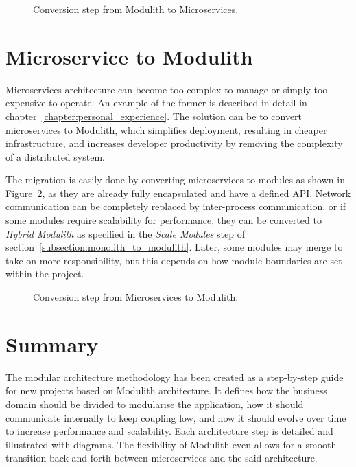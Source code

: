 \begin{figure}
    \centering
    
    \caption{Conversion step from Modulith to Microservices.\label{fig:modulith_to_microservices_steps}}
\end{figure}


\section{Microservice to Modulith}
\label{subsection:microservices_to_modulith}
Microservices architecture can become too complex to manage or simply too expensive to operate. An example of the former is described in detail in chapter~\ref{chapter:personal_experience}. The solution can be to convert microservices to Modulith, which simplifies deployment, resulting in cheaper infrastructure, and increases developer productivity by removing the complexity of a distributed system.

The migration is easily done by converting microservices to modules as shown in Figure~\ref{fig:microservices_to_modulith_steps}, as they are already fully encapsulated and have a defined API. Network communication can be completely replaced by inter-process communication, or if some modules require scalability for performance, they can be converted to \textit{Hybrid Modulith} as specified in the \textit{Scale Modules} step of section~\ref{subsection:monolith_to_modulith}. Later, some modules may merge to take on more responsibility, but this depends on how module boundaries are set within the project.

\begin{figure}
    \centering
    
    \caption{Conversion step from Microservices to Modulith.\label{fig:microservices_to_modulith_steps}}
\end{figure}

\section{Summary}
The modular architecture methodology has been created as a step-by-step guide for new projects based on Modulith architecture. It defines how the business domain should be divided to modularise the application, how it should communicate internally to keep coupling low, and how it should evolve over time to increase performance and scalability. Each architecture step is detailed and illustrated with diagrams. The flexibility of Modulith even allows for a smooth transition back and forth between microservices and the said architecture.

